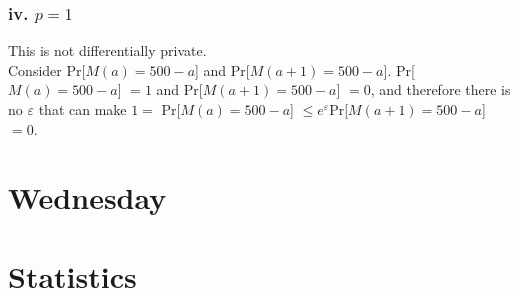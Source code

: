 \documentclass{article}
\begin{document}
\subsubsection*{iv. $p=1$}
This is not differentially private. \\
Consider Pr[$M(a)=500-a$] and Pr[$M(a+1)=500-a$]. Pr[$M(a)=500-a$] $= 1$ and Pr[$M(a+1)=500-a$] $= 0$, and therefore there is no $\varepsilon$ that can make $1=$ Pr[$M(a)=500-a$] $ \leq e^{\varepsilon}$Pr[$M(a+1)=500-a$] $= 0$.


\section*{{\textcolor{Boogie}{Wednesday}}}
\section*{Statistics}
\end{document}

